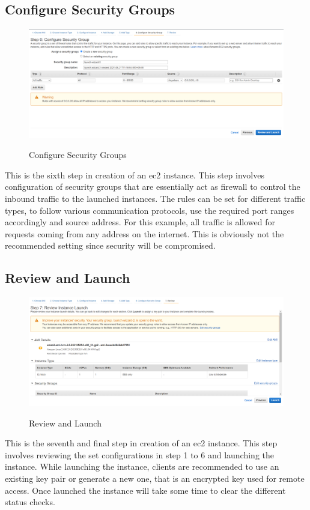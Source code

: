 \documentclass{home_assignment}
\begin{document}
\subsection{Configure Security Groups}
\begin{figure}[H]
    \centering
    \includegraphics[frame,width=\linewidth]{../Figures/f.png}
    \label{fig:f}
    \caption{Configure Security Groups}
\end{figure}
This is the sixth step in creation of an \acrshort{ec2} instance. This step involves configuration of security groups that are essentially act as firewall to control the inbound traffic to the launched instances. The rules can be set for different traffic types, to follow various communication protocols, use the required port ranges accordingly and source address. For this example, all traffic is allowed for requests coming from any address on the internet. This is obviously not the recommended setting since security will be compromised. 

\subsection{Review and Launch}
\begin{figure}[H]
    \centering
    \includegraphics[frame,width=\linewidth]{../Figures/g.png}
    \label{fig:g}
    \caption{Review and Launch}
\end{figure}

This is the seventh and final step in creation of an \acrshort{ec2} instance. This step involves reviewing the set configurations in step 1 to 6 and launching the instance. While launching the instance, clients are recommended to use an existing key pair or generate a new one, that is an encrypted key used for remote access. Once launched the instance will take some time to clear the different status checks.
\end{document}
